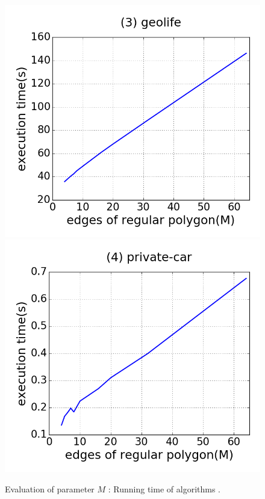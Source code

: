 \begin{figure}[tb!]
\includegraphics[scale = 0.24]{figures/Exp-M-time-geolife.png}
\includegraphics[scale = 0.24]{figures/Exp-M-time-private.png}
\vspace{-2ex}
\caption{\small Evaluation of parameter $M$ : Running time of algorithms \cista.}
\label{fig:m-time-cista}
\vspace{-1ex}
\end{figure}


